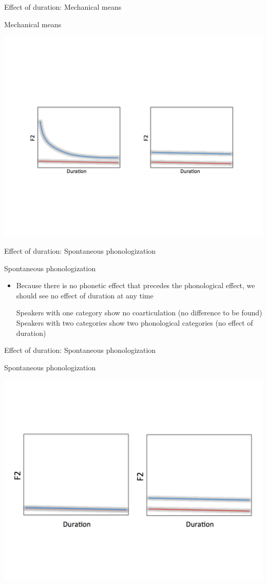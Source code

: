 \documentclass[hyperref={pdfpagelabels=false}]{beamer}
\begin{document}
\begin{frame}{Effect of duration: Mechanical means}
	\begin{block}{Mechanical means}
		\begin{center}
		\includegraphics[trim=2cm 2cm 2cm 2cm, clip=false, width=.7\textwidth]{DurationEx.pdf}
		\end{center}
	\end{block}	
\end{frame}

\begin{frame}{Effect of duration: Spontaneous phonologization}
	\begin{block}{Spontaneous phonologization}
		\begin{itemize}
			\item Because there is no phonetic effect that precedes the phonological effect, we should see no effect of duration at any time \pause
			\begin{xlist}
				\ex Speakers with one category show no coarticulation (no difference to be found) \pause
				\ex Speakers with two categories show two phonological categories (no effect of duration) 
			\end{xlist}
		\end{itemize}
	\end{block}	
\end{frame}

\begin{frame}{Effect of duration: Spontaneous phonologization}
	\begin{block}{Spontaneous phonologization}
	\begin{center}
	\includegraphics[trim=2cm 2cm 2cm 2cm, clip=false, width=.7\textwidth]{spontdurex.pdf}
	\end{center}
	\end{block}	
\end{frame}
\end{document}
